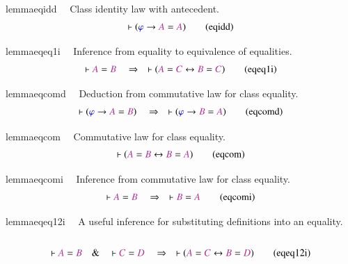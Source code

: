 \begin{restatable}{lemma}{eqidd}~~ Class identity law with antecedent. 
~
\begin{align}
\vdash ( \mw{\varphi} \rightarrow \mc{A} = \mc{A} )\label{eq:eqidd}\tag{eqidd}
\end{align}
\end{restatable}

\begin{restatable}{lemma}{eqeq1i}~~ Inference from equality to equivalence of
equalities.  ~
\begin{align}
\vdash \mc{A} = \mc{B}\quad\Rightarrow\quad \vdash ( \mc{A} = \mc{C}
    \leftrightarrow \mc{B} = \mc{C} )\label{eq:eqeq1i}\tag{eqeq1i}
\end{align}
\end{restatable}

\begin{restatable}{lemma}{eqcomd}~~ Deduction from commutative law for class
equality.  
\begin{align}
\vdash ( \mw{\varphi} \rightarrow \mc{A} = \mc{B} )\quad\Rightarrow\quad \vdash
    ( \mw{\varphi} \rightarrow \mc{B} = \mc{A} )\label{eq:eqcomd}\tag{eqcomd}
\end{align}
\end{restatable}

\begin{restatable}{lemma}{eqcom}~~ Commutative law for class equality.  
\begin{align}
\vdash ( \mc{A} = \mc{B} \leftrightarrow \mc{B} = \mc{A}
    )\label{eq:eqcom}\tag{eqcom}
\end{align}
\end{restatable}

\begin{restatable}{lemma}{eqcomi}~~ Inference from commutative law for class
equality.  ~
\begin{align}
\vdash \mc{A} = \mc{B}\quad\Rightarrow\quad \vdash \mc{B} =
    \mc{A}\label{eq:eqcomi}\tag{eqcomi}
\end{align}
\end{restatable}

\begin{restatable}{lemma}{eqeq12i}~~ A useful inference for substituting
definitions into an equality.
       ~  ~  ~
\begin{align}
\vdash \mc{A} = \mc{B}\quad\&\quad \vdash \mc{C} = \mc{D}\quad\Rightarrow\quad
    \vdash ( \mc{A} = \mc{C} \leftrightarrow \mc{B} = \mc{D}
    )\label{eq:eqeq12i}\tag{eqeq12i}
\end{align}
\end{restatable}

